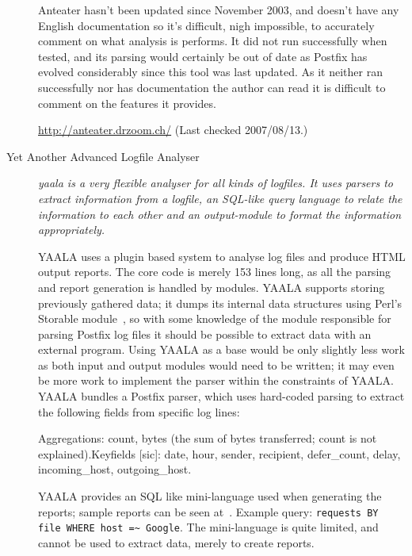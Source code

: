 \documentclass[a4paper,12pt,draft]{article}
\begin{document}
\begin{description}
        Anteater hasn't been updated since November 2003, and doesn't have
        any English documentation so it's difficult, nigh impossible, to
        accurately comment on what analysis is performs.  It did not run
        successfully when tested, and its parsing would certainly be out of
        date as Postfix has evolved considerably since this tool was last
        updated.  As it neither ran successfully nor has documentation the
        author can read it is difficult to comment on the features it
        provides.
        
        \url{http://anteater.drzoom.ch/} \newline (Last checked
        2007/08/13.)

    \item [Yet Another Advanced Logfile Analyser] \textit{yaala is a very
        flexible analyser for all kinds of logfiles. It uses parsers to
        extract information from a logfile, an SQL-like query language to
        relate the information to each other and an output-module to format
        the information appropriately.\/}

        YAALA uses a plugin based system to analyse log files and produce
        HTML output reports.  The core code is merely 153 lines long, as
        all the parsing and report generation is handled by modules.  YAALA
        supports storing previously gathered data; it dumps its internal
        data structures using Perl's Storable module~\cite{perl-storable},
        so with some knowledge of the module responsible for parsing
        Postfix log files it should be possible to extract data with an
        external program.  Using YAALA as a base would be only slightly
        less work as both input and output modules would need to be
        written; it may even be more work to implement the parser within
        the constraints of YAALA\@.  YAALA bundles a Postfix parser, which
        uses hard-coded parsing to extract the following fields from
        specific log lines:

        Aggregations: count, bytes (the sum of bytes transferred; count is
        not explained).\newline Keyfields [sic]: date, hour, sender,
        recipient, defer\_count, delay, incoming\_host, outgoing\_host.

        YAALA provides an SQL like mini-language used when generating the
        reports; sample reports can be seen at~\cite{yaala-samples}.
        Example query: \newline \hspace*{2em} \texttt{requests BY file
        WHERE host =\~{} Google}. \newline The mini-language is quite
        limited, and cannot be used to extract data, merely to create
        reports.


\end{description}
\end{document}

